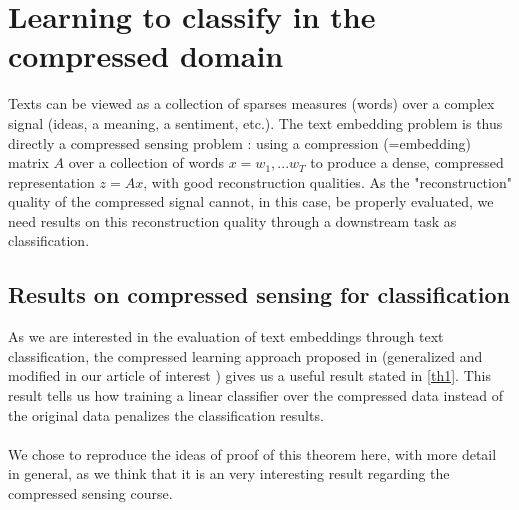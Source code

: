 \documentclass{article}
\begin{document}



\section{Learning to classify in the compressed domain}

Texts can be viewed as a collection of sparses measures (words) 
over a complex signal (ideas, a meaning, a sentiment, etc.). The
text embedding problem is thus directly a compressed sensing problem : 
using a compression (=embedding) matrix $A$ over a collection of 
words $x=w_1, ...w_T$ to produce a dense, compressed representation 
$z = Ax$, with good reconstruction qualities. As the "reconstruction"
quality of the compressed signal cannot, in this case, 
be properly evaluated, we need results on this reconstruction
quality through a downstream task as classification. 

\subsection{Results on compressed sensing for classification}

As we are interested in the evaluation of text embeddings through 
text classification, the compressed learning approach proposed 
in \cite{Calderbank2009CompressedL} (generalized and modified in 
our article of interest \cite{arora2018sensing}) gives us a useful result
stated in \ref{th1}. This result tells us how training a linear 
classifier over the compressed data instead of the original data 
penalizes the classification results. \\ \\We chose to reproduce the
 ideas of proof of this theorem here, with more detail in general, as we think that it is 
an very interesting result regarding the compressed sensing course. 
\end{document}
